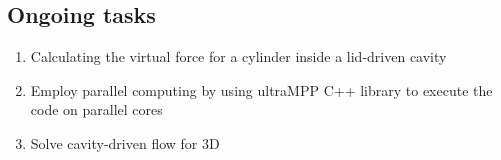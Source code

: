 \documentclass[12pt,a4paper,fleqn]{article}
\begin{document}
\subsection{Ongoing tasks}
\begin{enumerate}
    \item Calculating the virtual force for a cylinder inside a lid-driven cavity
    \item Employ parallel computing by using ultraMPP C++ library to execute the code on parallel cores
    \item Solve cavity-driven flow for 3D
\end{enumerate}
\end{document}
